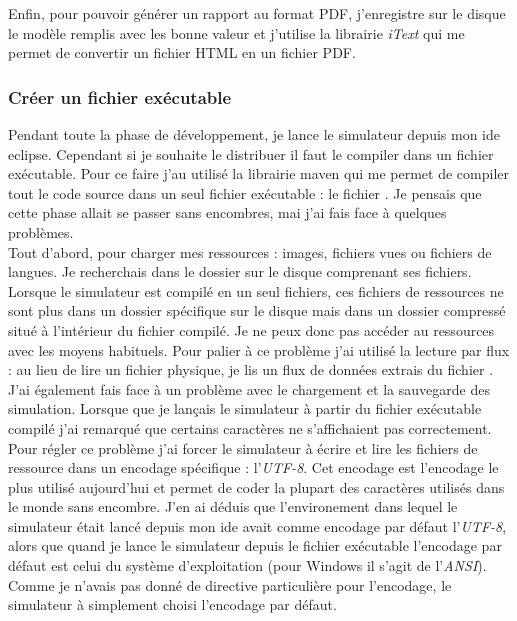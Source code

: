 Enfin, pour pouvoir générer un rapport au format PDF, j'enregistre sur le disque le modèle remplis avec les bonne valeur et j'utilise la librairie \emph{iText} qui me permet de convertir un fichier HTML en un fichier PDF.

\subsubsection{Créer un fichier exécutable}
Pendant toute la phase de développement, je lance le simulateur depuis mon \gls{ide} \gls{eclipse}. Cependant si je souhaite le distribuer il faut le compiler dans un fichier exécutable. Pour ce faire j'au utilisé la librairie \gls{maven} qui me permet de compiler tout le code source dans un seul fichier exécutable : le fichier . Je pensais que cette phase allait se passer sans encombres, mai j'ai fais face à quelques problèmes.\\

Tout d'abord, pour charger mes ressources : images, fichiers vues ou fichiers de langues. Je recherchais dans le dossier sur le disque comprenant ses fichiers. Lorsque le simulateur est compilé en un seul fichiers, ces fichiers de ressources ne sont plus dans un dossier spécifique sur le disque mais dans un dossier compressé situé à l'intérieur du fichier compilé. Je ne peux donc pas accéder au ressources avec les moyens habituels. Pour palier à ce problème j'ai utilisé la lecture par flux : au lieu de lire un fichier physique, je lis un flux de données extrais du fichier .\\

J'ai également fais face à un problème avec le chargement et la sauvegarde des simulation. Lorsque que je lançais le simulateur à partir du fichier exécutable compilé j'ai remarqué que certains caractères ne s'affichaient pas correctement. Pour régler ce problème j'ai forcer le simulateur à écrire et lire les fichiers de ressource dans un encodage spécifique : l'\emph{UTF-8}. Cet encodage est l'encodage le plus utilisé aujourd'hui et permet de coder la plupart des caractères utilisés dans le monde sans encombre. J'en ai déduis que l'environement dans lequel le simulateur était lancé depuis mon \gls{ide} avait comme encodage par défaut l'\emph{UTF-8}, alors que quand je lance le simulateur depuis le fichier exécutable l'encodage par défaut est celui du système d'exploitation (pour Windows il s'agit de l'\emph{ANSI}). Comme je n'avais pas donné de directive particulière pour l'encodage, le simulateur à simplement \og choisi \fg{} l'encodage par défaut.

